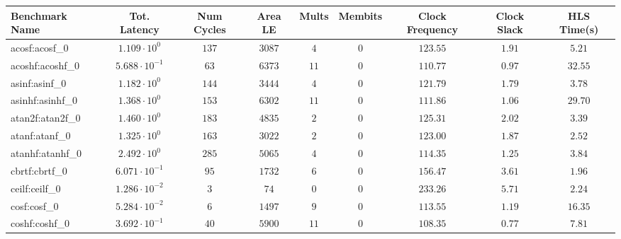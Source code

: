 \begin{tabular}{|l|c|c|c|c|c|c|c|c|}
\hline
Benchmark Name               & Tot. Latency            & Num Cycles & Area LE    & Mults   & Membits    & Clock Frequency & Clock Slack & HLS Time(s) \\
\hline
acosf:acosf\_0               & $ 1.109 \cdot 10^{0}  $ & $ 137    $ & $ 3087   $ & $ 4   $ & $ 0      $ & $ 123.55      $ & $ 1.91    $ & $ 5.21    $ \\
acoshf:acoshf\_0             & $ 5.688 \cdot 10^{-1} $ & $ 63     $ & $ 6373   $ & $ 11  $ & $ 0      $ & $ 110.77      $ & $ 0.97    $ & $ 32.55   $ \\
asinf:asinf\_0               & $ 1.182 \cdot 10^{0}  $ & $ 144    $ & $ 3444   $ & $ 4   $ & $ 0      $ & $ 121.79      $ & $ 1.79    $ & $ 3.78    $ \\
asinhf:asinhf\_0             & $ 1.368 \cdot 10^{0}  $ & $ 153    $ & $ 6302   $ & $ 11  $ & $ 0      $ & $ 111.86      $ & $ 1.06    $ & $ 29.70   $ \\
atan2f:atan2f\_0             & $ 1.460 \cdot 10^{0}  $ & $ 183    $ & $ 4835   $ & $ 2   $ & $ 0      $ & $ 125.31      $ & $ 2.02    $ & $ 3.39    $ \\
atanf:atanf\_0               & $ 1.325 \cdot 10^{0}  $ & $ 163    $ & $ 3022   $ & $ 2   $ & $ 0      $ & $ 123.00      $ & $ 1.87    $ & $ 2.52    $ \\
atanhf:atanhf\_0             & $ 2.492 \cdot 10^{0}  $ & $ 285    $ & $ 5065   $ & $ 4   $ & $ 0      $ & $ 114.35      $ & $ 1.25    $ & $ 3.84    $ \\
cbrtf:cbrtf\_0               & $ 6.071 \cdot 10^{-1} $ & $ 95     $ & $ 1732   $ & $ 6   $ & $ 0      $ & $ 156.47      $ & $ 3.61    $ & $ 1.96    $ \\
ceilf:ceilf\_0               & $ 1.286 \cdot 10^{-2} $ & $ 3      $ & $ 74     $ & $ 0   $ & $ 0      $ & $ 233.26      $ & $ 5.71    $ & $ 2.24    $ \\
cosf:cosf\_0                 & $ 5.284 \cdot 10^{-2} $ & $ 6      $ & $ 1497   $ & $ 9   $ & $ 0      $ & $ 113.55      $ & $ 1.19    $ & $ 16.35   $ \\
coshf:coshf\_0               & $ 3.692 \cdot 10^{-1} $ & $ 40     $ & $ 5900   $ & $ 11  $ & $ 0      $ & $ 108.35      $ & $ 0.77    $ & $ 7.81    $ \\

\end{tabular}
